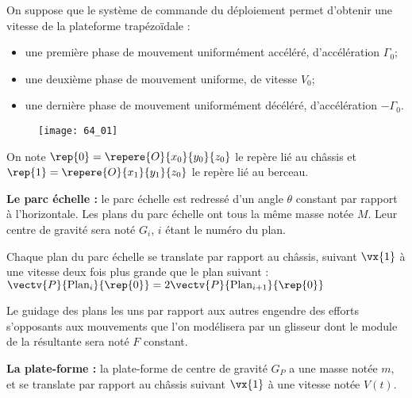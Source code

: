 \normalfalse \difficiletrue \tdifficilefalse
\correctionfalse



\setcounter{question}{0}
\ifcorrection
\else
{}
\fi

\ifprof
\else
On suppose que le système de commande du déploiement permet d’obtenir une vitesse de la plateforme
trapézoïdale :
\begin{itemize}
\item une première phase de mouvement uniformément accéléré, d’accélération $\Gamma_0$;
\item une deuxième phase de mouvement uniforme, de vitesse $V_0$;
\item une dernière phase de mouvement uniformément décéléré, d’accélération $-\Gamma_0$.
\end{itemize}
 
\begin{figure}[H]
\centering
\texttt{[image: 64\_01]}
\end{figure}


On note $\rep{0}=\repere{O}{x_0}{y_0}{z_0}$ le repère lié au châssis et
$\rep{1}=\repere{O}{x_1}{y_1}{z_0}$ le repère lié au berceau.

\textbf{Le parc échelle :} le parc échelle est redressé d’un angle $\theta$ constant par rapport à l’horizontale.
Les plans du parc échelle ont tous la même masse notée $M$. Leur centre de gravité sera noté $G_i$,
$i$ étant le numéro du plan.

Chaque plan du parc échelle se translate par rapport au châssis, suivant $\vx{1}$ à une vitesse deux
fois plus grande que le plan suivant :  $\vectv{P}{\text{Plan}_i}{\rep{0}}=2\vectv{P}{\text{Plan}_{i+1}}{\rep{0}}$

Le guidage des plans les uns par rapport aux autres engendre des efforts s’opposants aux
mouvements que l’on modélisera par un glisseur dont le module de la résultante sera noté $F$
constant.

\textbf{La plate-forme :} la plate-forme de centre de gravité $G_P$ a une masse notée $m$, et se translate par rapport au
châssis suivant $\vx{1}$ à une vitesse notée $V(t)$.

